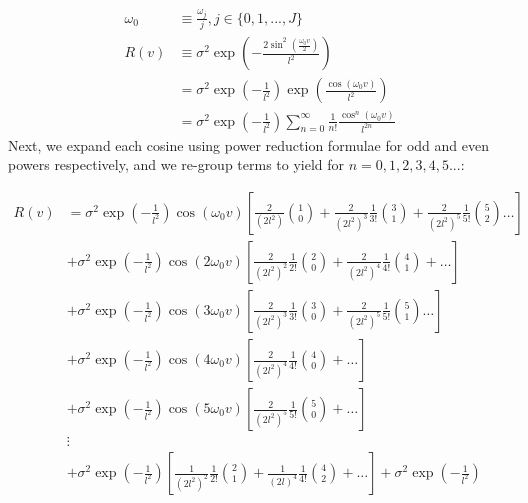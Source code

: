 \begin{align}
\omega_0 &\equiv \frac{\omega_j}{j}, j \in \{0, 1,..., J\} \\
R(v) &\equiv \sigma^2 \exp (- \frac{2\sin^2(\frac{\omega_0 v}{2})}{l^2}) \\
&=  \sigma^2 \exp (- \frac{1}{l^2}) \exp (\frac{\cos(\omega_0 v)}{l^2}) \label{eqn:periodic_0}\\
&=  \sigma^2 \exp (- \frac{1}{l^2}) \sum_{n = 0}^{\infty} \frac{1}{n!} \frac{\cos^n(\omega_0 v)}{l^{2n}} \label{eqn:periodic_1}
\end{align}
Next, we expand each cosine using power reduction formulae for odd and even powers respectively, and we re-group terms to yield for $n = 0,1,2,3,4,5...$:

\begin{widetext}
\begin{align}
R(v) &= \sigma^2 \exp (- \frac{1}{l^2}) \cos(\omega_0 v) \left[ \frac{2}{(2l^2)}\binom{1}{0} + \frac{2}{(2l^2)^3} \frac{1}{3!} \binom{3}{1} +  \frac{2}{(2l^2)^5} \frac{1}{5!}\binom{5}{2} \dots \right] \label{eqn:cosine1}\\
& + \sigma^2 \exp (- \frac{1}{l^2}) \cos(2\omega_0 v) \left[ \frac{2}{(2l^2)^2} \frac{1}{2!} \binom{2}{0} + \frac{2}{(2l^2)^4} \frac{1}{4!} \binom{4}{1} + \dots \right] \\
& + \sigma^2 \exp (- \frac{1}{l^2}) \cos(3\omega_0 v) \left[ \frac{2}{(2l^2)^3} \frac{1}{3!} \binom{3}{0} + \frac{2}{(2l^2)^5} \frac{1}{5!}\binom{5}{1} \dots \right] \\
& + \sigma^2 \exp (- \frac{1}{l^2}) \cos(4\omega_0 v) \left[ \frac{2}{(2l^2)^4} \frac{1}{4!} \binom{4}{0} + \dots \right] \\
& + \sigma^2 \exp (- \frac{1}{l^2}) \cos(5\omega_0 v) \left[ \frac{2}{(2l^2)^5} \frac{1}{5!}\binom{5}{0} + \dots \right] \label{eqn:cosine5}\\
& \vdots \nonumber \\
& + \sigma^2 \exp (- \frac{1}{l^2}) \left[ \frac{1}{(2l^2)^2} \frac{1}{2!} \binom{2}{1} + \frac{1}{(2l)^4} \frac{1}{4!} \binom{4}{2} + \dots \right] + \sigma^2 \exp (- \frac{1}{l^2}) \label{eqn:eventerms}
\end{align}


\end{widetext}

